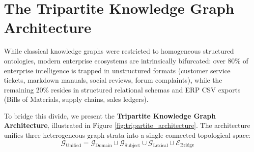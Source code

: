 \documentclass[10pt,twocolumn,letterpaper]{article}
\begin{document}
\section{The Tripartite Knowledge Graph Architecture}
\label{sec:tripartite}

While classical knowledge graphs were restricted to homogeneous structured ontologies, modern enterprise ecosystems are intrinsically bifurcated: over 80\% of enterprise intelligence is trapped in unstructured formats (customer service tickets, markdown manuals, social reviews, forum complaints), while the remaining 20\% resides in structured relational schemas and ERP CSV exports (Bills of Materials, supply chains, sales ledgers).

To bridge this divide, we present the \textbf{Tripartite Knowledge Graph Architecture}, illustrated in Figure \ref{fig:tripartite_architecture}. The architecture unifies three heterogeneous graph strata into a single connected topological space:
\begin{equation}
\mathcal{G}_{\text{Unified}} = \mathcal{G}_{\text{Domain}} \cup \mathcal{G}_{\text{Subject}} \cup \mathcal{G}_{\text{Lexical}} \cup \mathcal{E}_{\text{Bridge}}
\end{equation}
\end{document}
